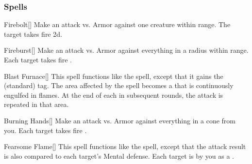 \subsubsection{Spells}


\lowercase{\hypertarget{spell:Firebolt}{}}\label{spell:Firebolt}
\begin{apability}[\nth{1}]{\hypertarget{spell:Firebolt}{Firebolt}}[]
Make an attack vs. Armor against one creature within \rngmed range.
\hit The target takes fire  \plus2d.
\end{apability}
\vspace{0.25em}



\lowercase{\hypertarget{spell:Fireburst}{}}\label{spell:Fireburst}
\begin{apability}[\nth{1}]{\hypertarget{spell:Fireburst}{Fireburst}}[]
Make an attack vs. Armor against everything in a \areasmall radius within \rngmed range.
\hit Each target takes fire .
\end{apability}
\vspace{0.25em}



\lowercase{\hypertarget{spell:Blast Furnace}{}}\label{spell:Blast Furnace}
\begin{apability}[\nth{2}]{\hypertarget{spell:Blast Furnace}{Blast Furnace}}[]
This spell functions like the  spell, except that it gains the  (standard) tag.
The area affected by the spell becomes a  that is continuously engulfed in flames.
At the end of each  in subsequent rounds, the attack is repeated in that area.
\end{apability}
\vspace{0.25em}



\lowercase{\hypertarget{spell:Burning Hands}{}}\label{spell:Burning Hands}
\begin{apability}[\nth{2}]{\hypertarget{spell:Burning Hands}{Burning Hands}}[]
Make an attack vs. Armor against everything in a \arealarge cone from you.
\hit Each target takes fire .
\end{apability}
\vspace{0.25em}



\lowercase{\hypertarget{spell:Fearsome Flame}{}}\label{spell:Fearsome Flame}
\begin{apability}[\nth{2}]{\hypertarget{spell:Fearsome Flame}{Fearsome Flame}}[]
This spell functions like the  spell, except that the attack result is also compared to each target's Mental defense.
\hit Each target is  by you as a .
\end{apability}
\vspace{0.25em}




